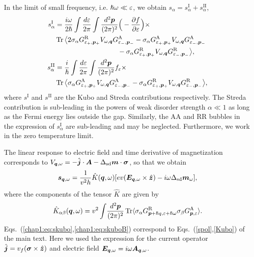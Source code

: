 In the limit of small frequency, i.e. $\hslash\omega\ll\varepsilon$, we obtain $s_\alpha = s^\text{I}_\alpha+s^\text{II}_\alpha$,
\begin{align}
    s^\text{I}_\alpha&=\frac{i\omega}{2\hslash}\int\frac{d\ep}{2\pi}\int \frac{d^2\bb{p}}{(2\pi)^2}\Big(-\frac{\partial f}{\partial \ep}\Big)\times\nonumber\\
    &\tr\big\langle
    2\sigma_\alpha G^\text{R}_{\ep_+,\bb{p}_+} V_{\omega,\bb{q}} G^\text{A}_{\ep_-,\bb{p}_-}-\sigma_\alpha G^\text{A}_{\ep_+,\bb{p}_+} V_{\omega,\bb{q}} G^\text{A}_{\ep_-,\bb{p}_-} \nonumber\\
    &\hspace{3.2cm}-\sigma_\alpha G^\text{R}_{\ep_+,\bb{p}_+} V_{\omega,\bb{q}} G^\text{R}_{\ep_-,\bb{p}_-}\big\rangle,\\
    s^\text{II}_\alpha&=\frac{i}{\hslash}\int\frac{d\ep}{2\pi}\int \frac{d^2\bb{p}}{(2\pi)^2} f_\ep\times\nonumber\\
     &\tr \big\langle\sigma_\alpha
    G^\text{A}_{\ep_+,\bb{p}_+} V_{\omega,\bb{q}} G^\text{A}_{\ep_-,\bb{p}_-}-
    \sigma_\alpha G^\text{R}_{\ep_+,\bb{p}_+} V_{\omega,\bb{q}} G^\text{R}_{\ep_-,\bb{p}_-}\big\rangle,
\end{align}
where $s^{\text{I}}$ and $s^\text{II}$ are the Kubo and Streda contributions respectively. The Streda contribution is sub-leading in the powers of weak disorder strength $\alpha\ll 1$ as long as the Fermi energy lies outside the gap. Similarly, the AA and RR bubbles in the expression of $s_\alpha^\text{I}$ are sub-leading and may be neglected. Furthermore, we work in the zero temperature limit. 

The linear response to electric field and time derivative of magnetization corresponds to $V_{\boldsymbol{q},\omega} = -\hat{\boldsymbol{j}}
\cdot\boldsymbol{A}-\Delta_\text{sd} \boldsymbol{m}\cdot\boldsymbol{\sigma}$, so that we obtain
\begin{equation}
  \boldsymbol{s}_{\boldsymbol{q},\omega}=\frac{1}{v^2h}\hat{K}(\boldsymbol{q},\omega)[ev(\boldsymbol{E}_{\boldsymbol{q},\omega}\times\hat{\boldsymbol{z}})-i\omega\Delta_{\text{sd}}\boldsymbol{m}_{\omega}],
  \label{chap1:eq:skubo}
\end{equation}
where the components of the tensor $\hat{K}$ are given by
\begin{equation}
\hat{K}_{\alpha\beta}(\boldsymbol{q},\omega)={v^2}\int\!\frac{d^2\boldsymbol{p}}{(2\pi)^2}\operatorname{Tr} \langle \sigma_\alpha G^\text{R}_{\boldsymbol{p}+ \hslash q,\varepsilon+\hslash\omega}\sigma_\beta G^\text{A}_{\boldsymbol{p},\varepsilon}\rangle.
\label{chap1:eq:skuboB}
\end{equation}
Eqs.~(\ref{chap1:eq:skubo},\ref{chap1:eq:skuboB}) correspond to Eqs.~(\ref{spol},\ref{Kubo}) of the main text. Here we used the expression for the current operator $\hat{\boldsymbol{j}} = v_f(\boldsymbol{\sigma}\times\hat{\boldsymbol{z}})$ and electric field $\boldsymbol{E}_{\boldsymbol{q},\omega}=i\omega \boldsymbol{A}_{\boldsymbol{q},\omega}$.

